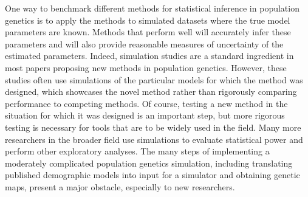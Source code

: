 \documentclass[12pt,halfline,a4paper]{ouparticle}
\begin{document}
One way to benchmark different methods for statistical inference in population
genetics is to apply the methods to simulated datasets where the true model
parameters are known. Methods that perform well will accurately infer these
parameters and will also provide reasonable measures of uncertainty of the
estimated parameters. Indeed, simulation studies are a standard ingredient in
most papers proposing new methods in population genetics. However, these
studies often use simulations of the particular models for which the method was designed,
which showcases the novel method rather than rigorously comparing performance to competing methods.
Of course, testing a new method in the situation for which it was designed is an important step,
but more rigorous testing is necessary for tools that are to be widely used in the field.
Many more researchers in the broader field
use simulations to evaluate statistical power and perform other exploratory analyses.
The many steps of implementing a moderately complicated population genetics simulation,
including translating published demographic models into input for a simulator
and obtaining genetic maps,
present a major obstacle, especially to new researchers.

\end{document}
